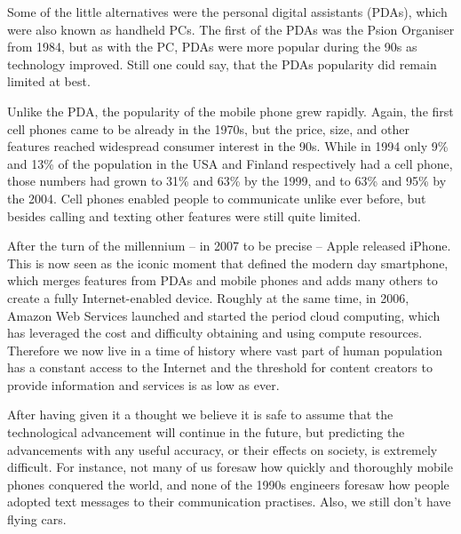 \documentclass[a4paper,12pt]{article}
\begin{document}
Some of the little alternatives were the personal digital assistants (PDAs), which were also known as handheld PCs. The first of the PDAs was the Psion Organiser from 1984, but as with the PC, PDAs were more popular during the 90s as technology improved. Still one could say, that the PDAs popularity did remain limited at best.

Unlike the PDA, the popularity of the mobile phone grew rapidly. Again, the first cell phones came to be already in the 1970s, but the price, size, and other features reached widespread consumer interest in the 90s. While in 1994 only 9\% and 13\% of the population in the USA and Finland respectively had a cell phone, those numbers had grown to 31\% and 63\% by the 1999, and to 63\% and 95\% by the 2004.\cite{sy15} Cell phones enabled people to communicate unlike ever before, but besides calling and texting other features were still quite limited.

After the turn of the millennium -- in 2007 to be precise -- Apple released iPhone. This is now seen as the iconic moment that defined the modern day smartphone, which merges features from PDAs and mobile phones and adds many others to create a fully Internet-enabled device. Roughly at the same time, in 2006, Amazon Web Services launched and started the period cloud computing, which has leveraged the cost and difficulty obtaining and using compute resources. Therefore we now live in a time of history where vast part of human population has a constant access to the Internet and the threshold for content creators to provide information and services is as low as ever.

After having given it a thought we believe it is safe to assume that the technological advancement will continue in the future, but predicting the advancements with any useful accuracy, or their effects on society, is extremely difficult. For instance, not many of us foresaw how quickly and thoroughly mobile phones conquered the world, and none of the 1990s engineers foresaw how people adopted text messages to their communication practises. Also, we still don't have flying cars.

\newpage
\end{document}
